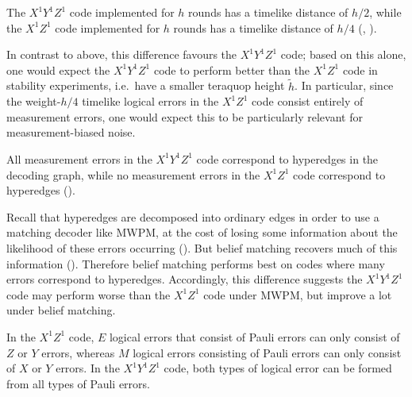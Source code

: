 \begin{difference}\label{dif:XYZ_XZ_timelike_distance}
    The $X^1 Y^1 Z^1$ code implemented for $h$ rounds has a timelike distance of $h/2$, while the $X^1 Z^1$ code implemented for $h$ rounds has a timelike distance of $h/4$ (, ).
\end{difference}

In contrast to  above, this difference favours the $X^1 Y^1 Z^1$ code;
based on this alone, one would expect the $X^1 Y^1 Z^1$ code to perform better than the $X^1 Z^1$ code in stability experiments,
i.e.\ have a smaller teraquop height $\tilde{h}$.
In particular, since the weight-$h/4$ timelike logical errors in the $X^1 Z^1$ code consist entirely of measurement errors,
one would expect this to be particularly relevant for measurement-biased noise.

\begin{difference}\label{dif:XYZ_XZ_hyperedges}
    All measurement errors in the $X^1 Y^1 Z^1$ code correspond to hyperedges in the decoding graph, while no measurement errors in the $X^1 Z^1$ code correspond to hyperedges ().
\end{difference}

Recall that hyperedges are decomposed into ordinary edges in order to use a matching decoder like MWPM,
at the cost of losing some information about the likelihood of these errors occurring ().
But belief matching recovers much of this information ().
Therefore belief matching performs best on codes where many errors correspond to hyperedges.
Accordingly, this difference suggests the $X^1 Y^1 Z^1$ code may perform worse than the $X^1 Z^1$ code under MWPM,
but improve a lot under belief matching.

\begin{difference}\label{dif:XYZ_XZ_logicals_pauli_type}
    In the $X^1 Z^1$ code, $E$ logical errors that consist of Pauli errors can only consist of $Z$ or $Y$ errors, whereas $M$ logical errors consisting of Pauli errors can only consist of $X$ or $Y$ errors.
    In the $X^1 Y^1 Z^1$ code, both types of logical error can be formed from all types of Pauli errors.
\end{difference}

